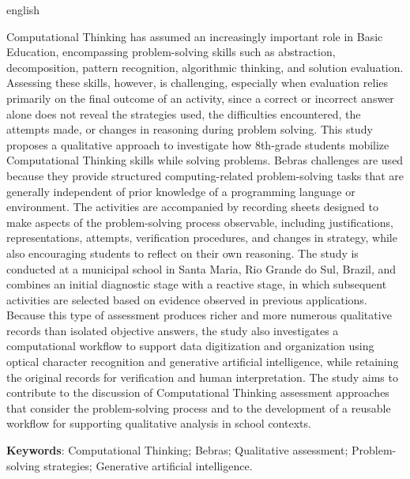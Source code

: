 \documentclass[
	article,			%
	12pt,				%
	oneside,			%
	a4paper,			%
	chapter=TITLE,		%
	section=TITLE,		%
	english,			%
	brazil,				%
    sumario=tradicional
	]{abntex2}
\begin{document}
\renewcommand{\resumoname}{Abstract}
\begin{resumoumacoluna}
\begin{otherlanguage*}{english}

Computational Thinking has assumed an increasingly important role in Basic Education, encompassing problem-solving skills such as abstraction, decomposition, pattern recognition, algorithmic thinking, and solution evaluation. Assessing these skills, however, is challenging, especially when evaluation relies primarily on the final outcome of an activity, since a correct or incorrect answer alone does not reveal the strategies used, the difficulties encountered, the attempts made, or changes in reasoning during problem solving. This study proposes a qualitative approach to investigate how 8th-grade students mobilize Computational Thinking skills while solving problems. Bebras challenges are used because they provide structured computing-related problem-solving tasks that are generally independent of prior knowledge of a programming language or environment. The activities are accompanied by recording sheets designed to make aspects of the problem-solving process observable, including justifications, representations, attempts, verification procedures, and changes in strategy, while also encouraging students to reflect on their own reasoning. The study is conducted at a municipal school in Santa Maria, Rio Grande do Sul, Brazil, and combines an initial diagnostic stage with a reactive stage, in which subsequent activities are selected based on evidence observed in previous applications. Because this type of assessment produces richer and more numerous qualitative records than isolated objective answers, the study also investigates a computational workflow to support data digitization and organization using optical character recognition and generative artificial intelligence, while retaining the original records for verification and human interpretation. The study aims to contribute to the discussion of Computational Thinking assessment approaches that consider the problem-solving process and to the development of a reusable workflow for supporting qualitative analysis in school contexts.

\noindent
\textbf{Keywords}: Computational Thinking; Bebras; Qualitative assessment; Problem-solving strategies; Generative artificial intelligence.

\end{otherlanguage*}
\end{resumoumacoluna}
\end{document}
